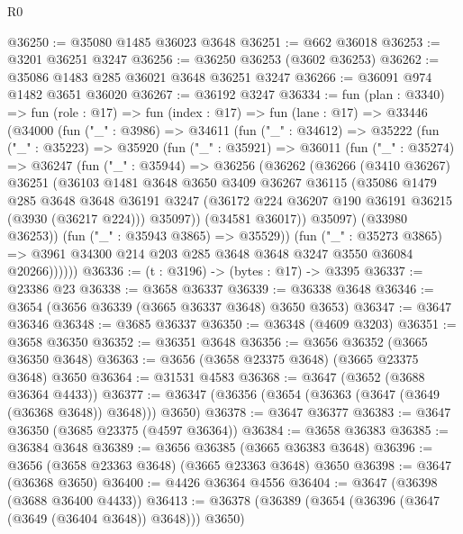 \begin{lexlean}{R0}
\begin{coremodule}
@36250 := @35080 @1485 @36023 @3648
@36251 := @662 @36018
@36253 := @3201 @36251 @3247
@36256 := @36250 @36253 (@3602 @36253)
@36262 := @35086 @1483 @285 @36021 @3648 @36251 @3247
@36266 := @36091 @974 @1482 @3651 @36020
@36267 := @36192 @3247
@36334 := fun (plan : @3340) =>
  fun (role : @17) =>
  fun (index : @17) =>
  fun (lane : @17) =>
  @33446
    (@34000
      (fun ("_" : @3986) =>
      @34611
        (fun ("_" : @34612) =>
        @35222
          (fun ("_" : @35223) =>
          @35920
            (fun ("_" : @35921) =>
            @36011
              (fun ("_" : @35274) =>
              @36247
                (fun ("_" : @35944) =>
                @36256
                  (@36262
                    (@36266
                      (@3410 @36267)
                      @36251
                      (@36103
                        @1481
                        @3648
                        @3650
                        @3409
                        @36267
                        @36115
                        (@35086
                          @1479
                          @285
                          @3648
                          @3648
                          @36191
                          @3247
                          (@36172 @224 @36207 @190 @36191 @36215 (@3930 (@36217 @224)))
                          @35097))
                      (@34581 @36017))
                    @35097)
                  (@33980 @36253))
                (fun ("_" : @35943 @3865) => @35529))
              (fun ("_" : @35273 @3865) =>
              @3961 @34300 @214 @203 @285 @3648 @3648 @3247 @3550 @36084 @20266))))))
@36336 := (t : @3196) -> (bytes : @17) -> @3395
@36337 := @23386 @23
@36338 := @3658 @36337
@36339 := @36338 @3648
@36346 := @3654 (@3656 @36339 (@3665 @36337 @3648) @3650 @3653)
@36347 := @3647 @36346
@36348 := @3685 @36337
@36350 := @36348 (@4609 @3203)
@36351 := @3658 @36350
@36352 := @36351 @3648
@36356 := @3656 @36352 (@3665 @36350 @3648)
@36363 := @3656 (@3658 @23375 @3648) (@3665 @23375 @3648) @3650
@36364 := @31531 @4583
@36368 := @3647 (@3652 (@3688 @36364 @4433))
@36377 := @36347 (@36356 (@3654 (@36363 (@3647 (@3649 (@36368 @3648)) @3648))) @3650)
@36378 := @3647 @36377
@36383 := @3647 @36350 (@3685 @23375 (@4597 @36364))
@36384 := @3658 @36383
@36385 := @36384 @3648
@36389 := @3656 @36385 (@3665 @36383 @3648)
@36396 := @3656 (@3658 @23363 @3648) (@3665 @23363 @3648) @3650
@36398 := @3647 (@36368 @3650)
@36400 := @4426 @36364 @4556
@36404 := @3647 (@36398 (@3688 @36400 @4433))
@36413 := @36378 (@36389 (@3654 (@36396 (@3647 (@3649 (@36404 @3648)) @3648))) @3650)

\end{coremodule}
\end{lexlean}
